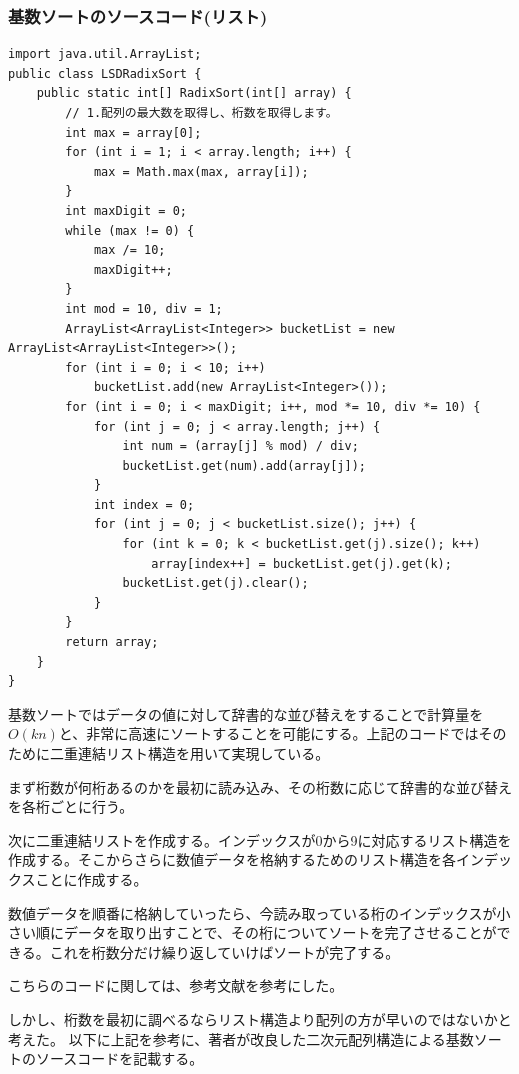 \documentclass[a4j,dvipdfmx]{jsreport}
\begin{document}
\subsubsection{基数ソートのソースコード(リスト)}
\lstset{caption=LSDRadixSort,firstnumber=1}
\begin{lstlisting}[style=source]
import java.util.ArrayList;
public class LSDRadixSort {
    public static int[] RadixSort(int[] array) {
        // 1.配列の最大数を取得し、桁数を取得します。
        int max = array[0];
        for (int i = 1; i < array.length; i++) {
            max = Math.max(max, array[i]);
        }
        int maxDigit = 0;
        while (max != 0) {
            max /= 10;
            maxDigit++;
        }
        int mod = 10, div = 1;
        ArrayList<ArrayList<Integer>> bucketList = new ArrayList<ArrayList<Integer>>();
        for (int i = 0; i < 10; i++)
            bucketList.add(new ArrayList<Integer>());
        for (int i = 0; i < maxDigit; i++, mod *= 10, div *= 10) {
            for (int j = 0; j < array.length; j++) {
                int num = (array[j] % mod) / div;
                bucketList.get(num).add(array[j]);
            }
            int index = 0;
            for (int j = 0; j < bucketList.size(); j++) {
                for (int k = 0; k < bucketList.get(j).size(); k++)
                    array[index++] = bucketList.get(j).get(k);
                bucketList.get(j).clear();
            }
        }
        return array;
    }
}
\end{lstlisting}

基数ソートではデータの値に対して辞書的な並び替えをすることで計算量を$O(kn)$と、非常に高速にソートすることを可能にする。上記のコードではそのために二重連結リスト構造を用いて実現している。\par
まず桁数が何桁あるのかを最初に読み込み、その桁数に応じて辞書的な並び替えを各桁ごとに行う。\par
次に二重連結リストを作成する。インデックスが0から9に対応するリスト構造を作成する。そこからさらに数値データを格納するためのリスト構造を各インデックスことに作成する。\par
数値データを順番に格納していったら、今読み取っている桁のインデックスが小さい順にデータを取り出すことで、その桁についてソートを完了させることができる。これを桁数分だけ繰り返していけばソートが完了する。\par
こちらのコードに関しては、参考文献\cite{cord1}を参考にした。
\\
\par
しかし、桁数を最初に調べるならリスト構造より配列の方が早いのではないかと考えた。
以下に上記を参考に、著者が改良した二次元配列構造による基数ソートのソースコードを記載する。
\end{document}
